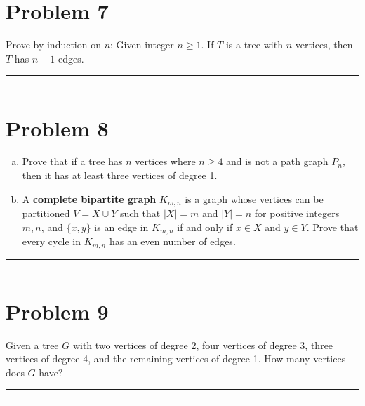 \documentclass{article}
\theoremstyle{definition}
\newenvironment{solution}{\bigskip\hrule{\hfill}}{\bigskip\hrule{\hfill}} %
\begin{document}
\section*{Problem 7}
Prove by induction on $n$: Given integer $n\geq 1$. If  $T$ is a tree with $n$ vertices, then $T$ has $n-1$ edges. 
\begin{solution}


\end{solution}


\newpage


\section*{Problem 8}
\begin{enumerate}[a)] %
	\item Prove that if a tree has $n$ vertices where $n\geq 4$ and is not a path graph $P_n$, then it has at least three vertices of degree 1.
	\item A \textbf{complete bipartite graph} $K_{m,n}$ is a graph whose vertices can be partitioned $V=X\cup Y$ such that $|X|=m$ and  $|Y|=n$ for positive integers $m,n$, and $\{x, y\}$ is an edge in $K_{m,n}$ if and only if $x\in X$ and $y\in Y$. Prove that every cycle in $K_{m, n}$ has an even number of edges.
\end{enumerate}
\begin{solution}


\end{solution}


\newpage


\section*{Problem 9}
Given a tree $G$ with two vertices of degree 2, four vertices of degree 3, three vertices of degree 4, and the remaining vertices of degree 1. How many vertices does $G$ have?    
\begin{solution}


\end{solution}

\end{document}
